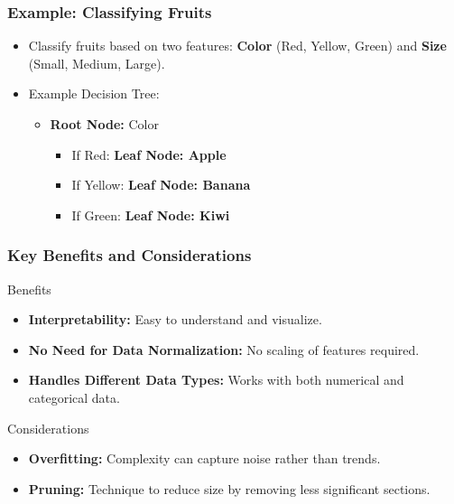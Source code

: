 \documentclass[aspectratio=169]{beamer}
\begin{document}
\begin{frame}[fragile]
    \frametitle{Example: Classifying Fruits}
    \begin{itemize}
        \item Classify fruits based on two features: \textbf{Color} (Red, Yellow, Green) and \textbf{Size} (Small, Medium, Large).
        \item Example Decision Tree:
        \begin{itemize}
            \item \textbf{Root Node:} Color
                \begin{itemize}
                    \item If Red: \textbf{Leaf Node: Apple}
                    \item If Yellow: \textbf{Leaf Node: Banana}
                    \item If Green: \textbf{Leaf Node: Kiwi}
                \end{itemize}
        \end{itemize}
    \end{itemize}
\end{frame}

\begin{frame}[fragile]
    \frametitle{Key Benefits and Considerations}
    \begin{block}{Benefits}
        \begin{itemize}
            \item \textbf{Interpretability:} Easy to understand and visualize.
            \item \textbf{No Need for Data Normalization:} No scaling of features required.
            \item \textbf{Handles Different Data Types:} Works with both numerical and categorical data.
        \end{itemize}
    \end{block}
    \begin{block}{Considerations}
        \begin{itemize}
            \item \textbf{Overfitting:} Complexity can capture noise rather than trends.
            \item \textbf{Pruning:} Technique to reduce size by removing less significant sections.
        \end{itemize}
    \end{block}
\end{frame}
\end{document}
